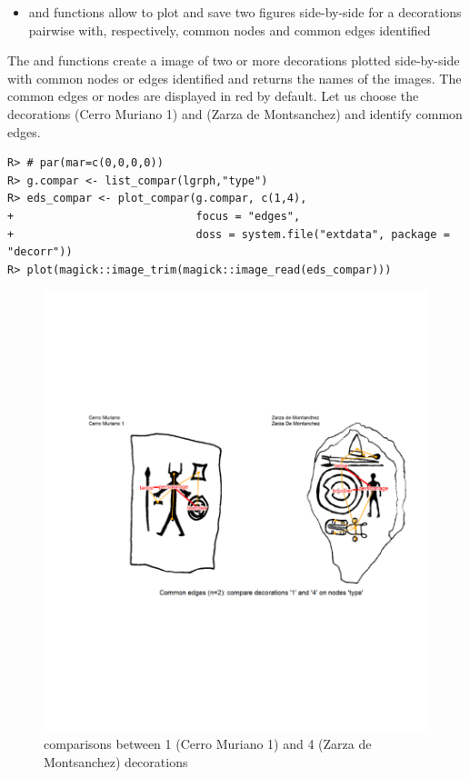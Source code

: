\documentclass[article]{jss}\usepackage{knitr}
\begin{document}
\begin{itemize}
\setlength\itemsep{.1em}
\item {} and  functions allow to plot and save two figures side-by-side for a decorations pairwise with, respectively, common nodes and common edges identified
\end{itemize}

The and  functions create a  image of two or more decorations plotted side-by-side with common nodes or edges identified and returns the names of the images. The common edges or nodes are displayed in red by default.
Let us choose the decorations  (Cerro Muriano 1) and  (Zarza de Montsanchez) and identify common edges.

\begin{kframe}
\begin{verbatim}
R> # par(mar=c(0,0,0,0))
R> g.compar <- list_compar(lgrph,"type")
R> eds_compar <- plot_compar(g.compar, c(1,4),
+                            focus = "edges",
+                            doss = system.file("extdata", package = "decorr"))
R> plot(magick::image_trim(magick::image_read(eds_compar)))
\end{verbatim}
\end{kframe}\begin{figure}[H]

{\centering \includegraphics[width=\maxwidth]{figure/unnamed-chunk-6-1} 

}

\caption{\label{fig:figs}comparisons between 1 (Cerro Muriano 1) and 4 (Zarza de Montsanchez) decorations}\label{fig:unnamed-chunk-6}
\end{figure}
\end{document}
